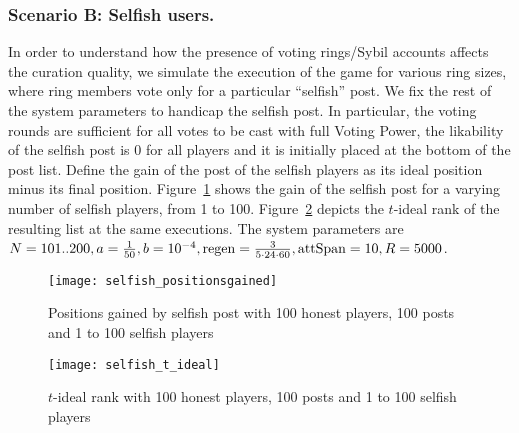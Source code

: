     \subsubsection{Scenario B: Selfish users.}
      In order to understand how the presence of voting rings/Sybil accounts
      affects the curation quality, we simulate the execution of the game for
      various ring sizes, where ring members vote only for a particular
      ``selfish'' post. We fix the rest of the system parameters to handicap the
      selfish post. In particular, the voting rounds are sufficient for all
      votes to be cast with full Voting Power, the likability of the selfish
      post is 0 for all players and it is initially placed at the bottom of the
      post list. Define the gain of the post of the selfish players as its ideal
      position minus its final position. Figure~\ref{fig:selfish:gain} shows the
      gain of the selfish post for a varying number of selfish players, from 1
      to 100.  Figure~\ref{fig:selfish:tideal} depicts the $t$-ideal rank of the
      resulting list at the same executions. The system parameters are
      $N = 101 .. 200, a = \frac{1}{50}, b = 10^{-4}, \mathrm{regen} =
      \frac{3}{5 \cdot 24 \cdot 60}, \mathrm{attSpan} = 10, R = 5000$.

      \begin{figure}[!htbp]
        \texttt{[image: selfish\_positionsgained]}
        \caption{Positions gained by selfish post with 100 honest players, 100
        posts and 1 to 100 selfish players}
        \label{fig:selfish:gain}
      \end{figure}

      \begin{figure}[!htbp]
        \texttt{[image: selfish\_t\_ideal]}
        \caption{$t$-ideal rank with 100 honest players, 100 posts and 1 to 100
        selfish players}
        \label{fig:selfish:tideal}
      \end{figure}
